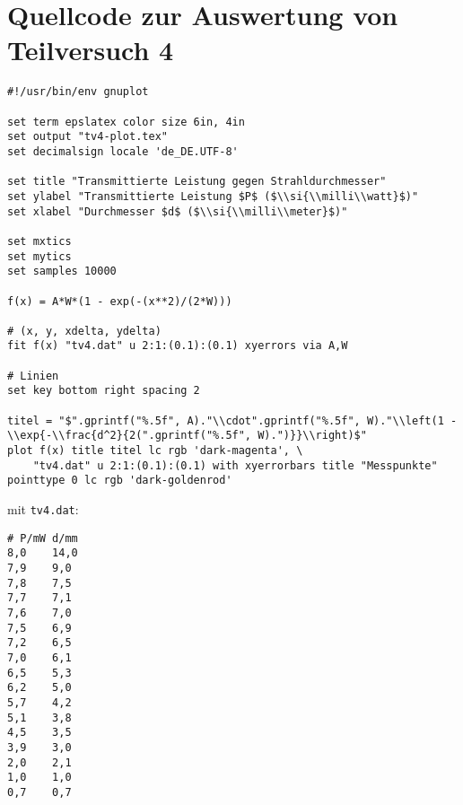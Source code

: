 \section{\gnuplot{} Quellcode zur Auswertung von Teilversuch 4}
    \label{appdx:gnuplottv4}
    {  
        \renewcommand{\fcolorbox}[4][]{#4}
        \begin{verbatim}
#!/usr/bin/env gnuplot

set term epslatex color size 6in, 4in
set output "tv4-plot.tex"
set decimalsign locale 'de_DE.UTF-8'

set title "Transmittierte Leistung gegen Strahldurchmesser"
set ylabel "Transmittierte Leistung $P$ ($\\si{\\milli\\watt}$)"
set xlabel "Durchmesser $d$ ($\\si{\\milli\\meter}$)"

set mxtics
set mytics
set samples 10000

f(x) = A*W*(1 - exp(-(x**2)/(2*W)))

# (x, y, xdelta, ydelta)
fit f(x) "tv4.dat" u 2:1:(0.1):(0.1) xyerrors via A,W

# Linien
set key bottom right spacing 2

titel = "$".gprintf("%.5f", A)."\\cdot".gprintf("%.5f", W)."\\left(1 - \\exp{-\\frac{d^2}{2(".gprintf("%.5f", W).")}}\\right)$"
plot f(x) title titel lc rgb 'dark-magenta', \
    "tv4.dat" u 2:1:(0.1):(0.1) with xyerrorbars title "Messpunkte" pointtype 0 lc rgb 'dark-goldenrod'
        \end{verbatim}
    }
    mit \texttt{tv4.dat}:
    \begin{multicols}{2}
        \begin{verbatim}
# P/mW d/mm
8,0    14,0
7,9    9,0
7,8    7,5
7,7    7,1
7,6    7,0
7,5    6,9
7,2    6,5
7,0    6,1
6,5    5,3
6,2    5,0
5,7    4,2
5,1    3,8
4,5    3,5
3,9    3,0
2,0    2,1
1,0    1,0
0,7    0,7
        \end{verbatim}
    \end{multicols}
